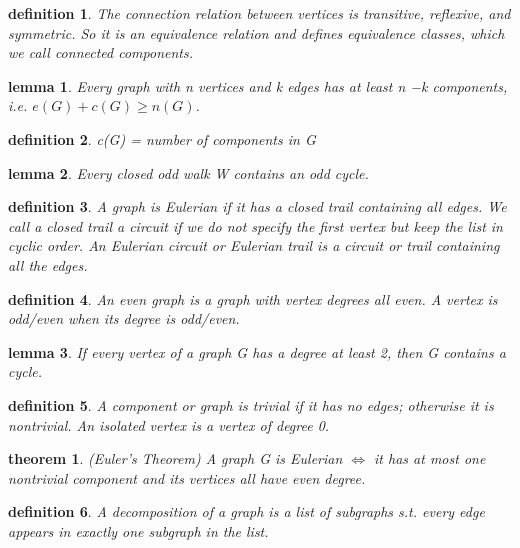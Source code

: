 \documentclass[twocolumn]{article}
\newtheorem{theorem}{theorem}[section]  %
\newtheorem{definition}{definition}
\newtheorem{lemma}{lemma}
\begin{document}
\begin{CJK*}{UTF8}{bkai}
    \begin{definition}
        The connection relation between vertices is transitive, reflexive, and
 symmetric. So it is an equivalence relation and defines equivalence classes,
 which we call connected components.
    \end{definition}

    \begin{lemma}
         Every graph with n vertices and k edges has at least n −k components, i.e.
 $e(G) +c(G) \geq n(G)$.
    \end{lemma}

    \begin{definition}
         c(G) = number of components in G
    \end{definition}

    \begin{lemma}
         Every closed odd walk W contains an odd cycle.
    \end{lemma}

    \begin{definition}
        A graph is Eulerian if it has a closed trail containing all edges. We call a
 closed trail a circuit if we do not specify the first vertex but keep the list in
 cyclic order. An Eulerian circuit or Eulerian trail is a circuit or trail
 containing all the edges.
    \end{definition}

    \begin{definition}
        An even graph is a graph with vertex degrees all even. A vertex is odd/even
 when its degree is odd/even.
    \end{definition}

    \begin{lemma}
        If every vertex of a graph G has a degree at least 2, then G contains a cycle.
    \end{lemma}

    \begin{definition}
         A component or graph is trivial if it has no edges; otherwise it is nontrivial.
 An isolated vertex is a vertex of degree 0.
    \end{definition}

    \begin{theorem}{(Euler's Theorem)}
        A graph G is Eulerian $\iff$ it has at most one nontrivial component and its
 vertices all have even degree.
    \end{theorem}
    
    \begin{definition}
        A decomposition of a graph is a list of subgraphs s.t. every edge appears in
 exactly one subgraph in the list.
    \end{definition}


\end{CJK*}
\end{document}
